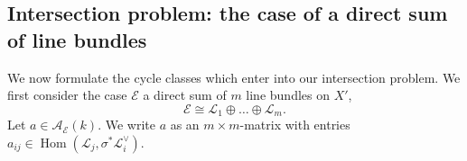 \documentclass[reqno]{amsart}
\numberwithin{equation}{section}
\newcommand{\Cal}[1]{\mathcal{#1}}
\DeclareMathOperator{\Hom}{Hom}
\DeclareMathOperator{\Sht}{Sht}
\newcommand{\s}{\sigma}
\newcommand\cL{\mathcal{L}}
\theoremstyle{remark}
\numberwithin{equation}{section}
\begin{document}
\subsection{Intersection problem: the case of a direct sum of line bundles}\label{ssec: KR cycle classes}
We now formulate the cycle classes which enter into our intersection problem.  We first consider the case $\Cal{E}$ a direct sum of $m$ line bundles on $X'$,
\begin{equation}
\Cal{E} \cong \Cal{L}_1 \oplus \ldots \oplus \Cal{L}_m.
\end{equation}
Let $a \in \Cal{A}_{\Cal{E}}(k)$. We write $a$ as an $m\times m$-matrix with entries $a_{ij}\in \Hom(\cL_{j}, \s^{*}\cL^{\vee}_{i})$. 
\end{document}
